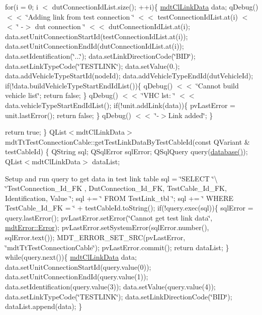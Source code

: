 for(i = 0; i $<$ dut\-Connection\-Id\-List.\-size(); ++i)\{ \hyperlink{classmdt_cl_link_data}{mdt\-Cl\-Link\-Data} data; q\-Debug() $<$$<$ \char`\"{}\-Adding link from test connection \char`\"{} $<$$<$ test\-Connection\-Id\-List.\-at(i) $<$$<$ \char`\"{} -\/$>$ dut connection \char`\"{} $<$$<$ dut\-Connection\-Id\-List.\-at(i); data.\-set\-Unit\-Connection\-Start\-Id(test\-Connection\-Id\-List.\-at(i)); data.\-set\-Unit\-Connection\-End\-Id(dut\-Connection\-Id\-List.\-at(i)); data.\-set\-Identification(\char`\"{}...\char`\"{}); data.\-set\-Link\-Direction\-Code(\char`\"{}\-B\-I\-D\char`\"{}); data.\-set\-Link\-Type\-Code(\char`\"{}\-T\-E\-S\-T\-L\-I\-N\-K\char`\"{}); data.\-set\-Value(0.); data.\-add\-Vehicle\-Type\-Start\-Id(node\-Id); data.\-add\-Vehicle\-Type\-End\-Id(dut\-Vehicle\-Id); if(!data.build\-Vehicle\-Type\-Start\-End\-Id\-List())\{ q\-Debug() $<$$<$ \char`\"{}\-Cannot build vehicle list\char`\"{}; return false; \} q\-Debug() $<$$<$ \char`\"{}\-V\-H\-C lst\-: \char`\"{} $<$$<$ data.\-vehicle\-Type\-Start\-End\-Id\-List(); if(!unit.add\-Link(data))\{ pv\-Last\-Error = unit.\-last\-Error(); return false; \} q\-Debug() $<$$<$ \char`\"{}-\/$>$\-Link added\char`\"{}; \}

return true; \} Q\-List$<$mdt\-Cl\-Link\-Data$>$ mdt\-Tt\-Test\-Connection\-Cable\-::get\-Test\-Link\-Data\-By\-Test\-Cable\-Id(const Q\-Variant \& test\-Cable\-Id) \{ Q\-String sql; Q\-Sql\-Error sql\-Error; Q\-Sql\-Query query(\hyperlink{classmdt_tt_base_a82c3f795b6cb8101b12e0e0ef340c1be}{database()}); Q\-List$<$mdt\-Cl\-Link\-Data$>$ data\-List;

Setup and run query to get data in test link table sql = \char`\"{}\-S\-E\-L\-E\-C\-T \char`\"{}\textbackslash{} \char`\"{}\-Test\-Connection\-\_\-\-Id\-\_\-\-F\-K , Dut\-Connection\-\_\-\-Id\-\_\-\-F\-K, Test\-Cable\-\_\-\-Id\-\_\-\-F\-K, Identification, Value \char`\"{}; sql += \char`\"{} F\-R\-O\-M Test\-Link\-\_\-tbl \char`\"{}; sql += \char`\"{} W\-H\-E\-R\-E Test\-Cable\-\_\-\-Id\-\_\-\-F\-K = \char`\"{} + test\-Cable\-Id.\-to\-String(); if(!query.exec(sql))\{ sql\-Error = query.\-last\-Error(); pv\-Last\-Error.\-set\-Error(\char`\"{}\-Cannot get test link data\char`\"{}, \hyperlink{classmdt_error_a5c8b1a040e2feaa848f6201d6b6f0cd7a35f5c05a7d15b6433445cdbffa6d5260}{mdt\-Error\-::\-Error}); pv\-Last\-Error.\-set\-System\-Error(sql\-Error.\-number(), sql\-Error.\-text()); M\-D\-T\-\_\-\-E\-R\-R\-O\-R\-\_\-\-S\-E\-T\-\_\-\-S\-R\-C(pv\-Last\-Error, \char`\"{}mdt\-Tt\-Test\-Connection\-Cable\char`\"{}); pv\-Last\-Error.\-commit(); return data\-List; \} while(query.\-next())\{ \hyperlink{classmdt_cl_link_data}{mdt\-Cl\-Link\-Data} data; data.\-set\-Unit\-Connection\-Start\-Id(query.\-value(0)); data.\-set\-Unit\-Connection\-End\-Id(query.\-value(1)); data.\-set\-Identification(query.\-value(3)); data.\-set\-Value(query.\-value(4)); data.\-set\-Link\-Type\-Code(\char`\"{}\-T\-E\-S\-T\-L\-I\-N\-K\char`\"{}); data.\-set\-Link\-Direction\-Code(\char`\"{}\-B\-I\-D\char`\"{}); data\-List.\-append(data); \}

